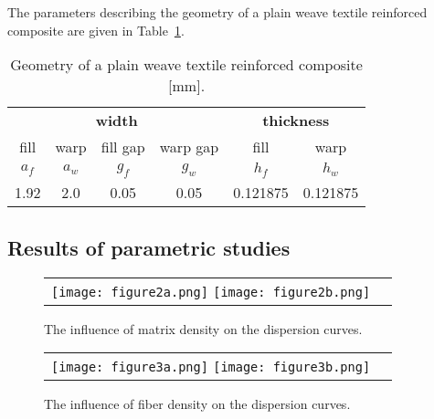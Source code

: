 \documentclass[]{spie}  %
\begin{document}
The parameters describing the geometry of a plain weave textile reinforced composite 
are given in Table~\ref{tab:weave_geo}. 
\begin{table}[ht]
	\renewcommand{\arraystretch}{1.3}
	\caption{Geometry of a plain weave textile reinforced composite [mm].}
	\label{tab:weave_geo}
	\begin{center}
		\begin{tabular}{cccccc} 
			\toprule
			\multicolumn{4}{c}{\textbf{width} }	& \multicolumn{2}{c}{\textbf{thickness} }  \\ 
			\cmidrule(lr){1-4} \cmidrule(lr){5-6} 
			fill & warp & fill gap& warp gap& fill & warp\\
			\(a_f\) &\(a_w\)& \(g_f\)  & \(g_w\)  & \(h_f\)& \(h_w\) \\ 
			\cmidrule(lr){1-2} \cmidrule(lr){3-4} \cmidrule(lr){5-6}
			1.92 &2.0& 0.05& 0.05 & 0.121875 & 0.121875 \\
			\bottomrule 
		\end{tabular} 
	\end{center}
\end{table}

\subsection{Results of parametric studies}

\begin{figure} [ht]
	\begin{center}
		\begin{tabular}{cc} %
			\texttt{[image: figure2a.png]}
			\texttt{[image: figure2b.png]}
		\end{tabular}
	\end{center}
	\caption[] 
	{ \label{fig:rhom} 
		The influence of matrix density on the dispersion curves.}
\end{figure} 

\begin{figure} [ht]
	\begin{center}
		\begin{tabular}{cc} %
			\texttt{[image: figure3a.png]}
			\texttt{[image: figure3b.png]}
		\end{tabular}
	\end{center}
	\caption[] 
	{ \label{fig:rhof} 
		The influence of fiber density on the dispersion curves.}
\end{figure} 
\end{document}
